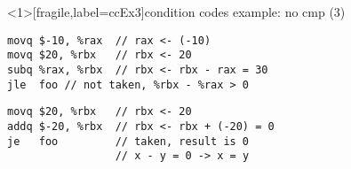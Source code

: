 \begin{frame}<1>[fragile,label=ccEx3]{condition codes example: no cmp (3)}
\begin{lstlisting}[language=myasm]
movq $-10, %rax  // rax <- (-10)
movq $20, %rbx   // rbx <- 20
subq %rax, %rbx  // rbx <- rbx - rax = 30
jle  foo // not taken, %rbx - %rax > 0
\end{lstlisting}
\begin{lstlisting}[language=myasm]
movq $20, %rbx   // rbx <- 20
addq $-20, %rbx  // rbx <- rbx + (-20) = 0
je   foo         // taken, result is 0
                 // x - y = 0 -> x = y
\end{lstlisting}
\end{frame}
